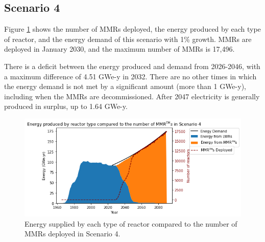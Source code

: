 \documentclass[preprint]{elsarticle}
\providecommand{\DIFaddbeginFL}{} %
\providecommand{\DIFaddendFL}{} %
\providecommand{\DIFdelbeginFL}{} %
\providecommand{\DIFdelendFL}{} %
\begin{document}
\subsection{Scenario 4}
Figure \ref{fig:energy_rx_4} shows the number of \glspl{MMR} deployed, the
energy produced by each type of reactor, and the energy demand of this
scenario with 1\% growth. \glspl{MMR} are deployed in January 2030, and the maximum 
number of \glspl{MMR} is 17,496. 

There is a deficit between the energy produced and  
demand from 2026-2046, with a maximum difference of 4.51 GWe-y in 2032.
There are no other times in which the energy demand is not met by a 
significant amount (more than 1 GWe-y), including when the \glspl{MMR} are 
decommissioned. After 2047 electricity is generally produced in surplus, 
up to 1.64 GWe-y. 

\begin{figure}
    \centering 
    \DIFdelbeginFL %
\DIFdelendFL \DIFaddbeginFL \includegraphics[width=\textwidth]{../figures/energy_scenario4.png}
    \DIFaddendFL \caption{Energy supplied by each type of reactor compared to the number of 
    \glspl{MMR} deployed in Scenario 4.}
    \label{fig:energy_rx_4}
\end{figure}
\end{document}
